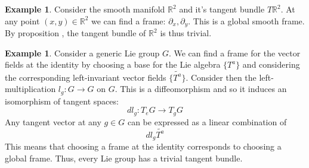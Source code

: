 \documentclass[12pt,a4paper]{report}
\theoremstyle{definition}
\theoremstyle{Theorem}
\theoremstyle{definition}
\newtheorem{Ex}[Def]{Example}
\theoremstyle{definition}
\begin{document}
		\begin{Ex}
			Consider the smooth manifold $\mathbb{R}^2$ and it's tangent bundle $T\mathbb{R}^2$. At any point $(x,y)\in\mathbb{R}^2$ we can find a frame: $\partial_x,\partial_y$. This is a global smooth frame. By proposition $\label{prop_2.3.1}$, the tangent bundle of $\mathbb{R}^2$ is thus trivial.
		\end{Ex}
				\begin{Ex}
					Consider a generic Lie group $G$. We can find a frame for the vector fields at the identity by choosing a base for the Lie algebra $\{T^a\}$ and considering the corresponding left-invariant vector fields $\{\tilde{T^a}\}$. Consider then the left-multiplication $l_g:G\rightarrow G$ on $G$. This is a diffeomorphism and so it induces an isomorphism of tangent spaces:
					$$dl_g:T_eG\rightarrow T_gG$$
					Any tangent vector at any $g\in G$ can be expressed as a linear combination of
					$$dl_g\tilde{T^a}$$
					This means that choosing a frame at the identity corresponds to choosing a global frame. Thus, every Lie group has a trivial tangent bundle. 
		\end{Ex}
\end{document}
